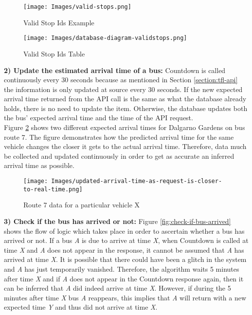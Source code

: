 \begin{figure}[H]
\centering
\begin{minipage}{.65\textwidth}
  \centering
  \texttt{[image: Images/valid-stops.png]}
  \caption{Valid Stop Ids Example}
  \label{fig:valid-stops-db}
\end{minipage}%
\begin{minipage}{.35\textwidth}
  \centering
  \texttt{[image: Images/database-diagram-validstops.png]}
  \caption{Valid Stop Ids Table}
  \label{fig:valid-stops-db-design}
\end{minipage}
\end{figure}

\textbf{2) Update the estimated arrival time of a bus: } Countdown is called continuously every 30 seconds because as mentioned in Section \ref{section:tfl-api} the information is only updated at source every 30 seconds. If the new expected arrival time returned from the API call is the same as what the database already holds, there is no need to update the item. Otherwise, the database updates both the bus' expected arrival time and the time of the API request. \\

Figure \ref{fig:more-accurate-closer-to-eta} shows two different expected arrival times for Dalgarno Gardens on bus route 7. The figure demonstrates how the predicted arrival time for the same vehicle changes the closer it gets to the actual arrival time. Therefore, data much be collected and updated continuously in order to get as accurate an inferred arrival time as possible.

\begin{figure}[H]
\begin{center}
    \texttt{[image: Images/updated-arrival-time-as-request-is-closer-to-real-time.png]}
    \caption{Route 7 data for a particular vehicle X}
    \label{fig:more-accurate-closer-to-eta}
\end{center}
\end{figure}

\textbf{3) Check if the bus has arrived or not:} Figure \ref{fig:check-if-bus-arrived} shows the flow of logic which takes place in order to ascertain whether a bus has arrived or not. If a bus \textit{A} is due to arrive at time \textit{X}, when Countdown is called at time \textit{X} and \textit{A} does not appear in the response, it cannot be assumed that \textit{A} has arrived at time \textit{X}. It is possible that there could have been a glitch in the system and \textit{A} has just temporarily vanished. Therefore, the algorithm waits 5 minutes after time \textit{X} and if \textit{A} does not appear in the Countdown response again, then it can be inferred that \textit{A} did indeed arrive at time \textit{X}. However, if during the 5 minutes after time \textit{X} bus \textit{A} reappears, this implies that \textit{A} will return with a new expected time \textit{Y} and thus did not arrive at time \textit{X}. 

